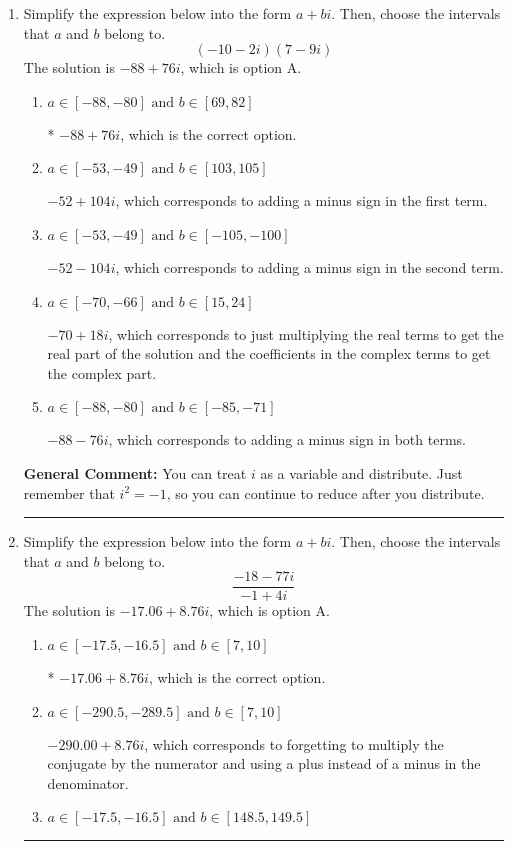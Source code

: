 \documentclass{extbook}[14pt]
\newcommand{\litem}[1]{\item #1

\rule{\textwidth}{0.4pt}}
\begin{document}
\begin{enumerate}
{ Irrational numbers are more than just square root of 3: adding or subtracting values from square root of 3 is also irrational.
}
\litem{
Simplify the expression below into the form $a+bi$. Then, choose the intervals that $a$ and $b$ belong to.
\[ (-10 - 2 i)(7 - 9 i) \]
The solution is \( -88 + 76 i \), which is option A.\begin{enumerate}[label=\Alph*.]
\item \( a \in [-88, -80] \text{ and } b \in [69, 82] \)

* $-88 + 76 i$, which is the correct option.
\item \( a \in [-53, -49] \text{ and } b \in [103, 105] \)

 $-52 + 104 i$, which corresponds to adding a minus sign in the first term.
\item \( a \in [-53, -49] \text{ and } b \in [-105, -100] \)

 $-52 - 104 i$, which corresponds to adding a minus sign in the second term.
\item \( a \in [-70, -66] \text{ and } b \in [15, 24] \)

 $-70 + 18 i$, which corresponds to just multiplying the real terms to get the real part of the solution and the coefficients in the complex terms to get the complex part.
\item \( a \in [-88, -80] \text{ and } b \in [-85, -71] \)

 $-88 - 76 i$, which corresponds to adding a minus sign in both terms.
\end{enumerate}

\textbf{General Comment:} You can treat $i$ as a variable and distribute. Just remember that $i^2=-1$, so you can continue to reduce after you distribute.
}
\litem{
Simplify the expression below into the form $a+bi$. Then, choose the intervals that $a$ and $b$ belong to.
\[ \frac{-18 - 77 i}{-1 + 4 i} \]
The solution is \( -17.06  + 8.76 i \), which is option A.\begin{enumerate}[label=\Alph*.]
\item \( a \in [-17.5, -16.5] \text{ and } b \in [7, 10] \)

* $-17.06  + 8.76 i$, which is the correct option.
\item \( a \in [-290.5, -289.5] \text{ and } b \in [7, 10] \)

 $-290.00  + 8.76 i$, which corresponds to forgetting to multiply the conjugate by the numerator and using a plus instead of a minus in the denominator.
\item \( a \in [-17.5, -16.5] \text{ and } b \in [148.5, 149.5] \)


\end{enumerate}}
\end{enumerate}
\end{document}

